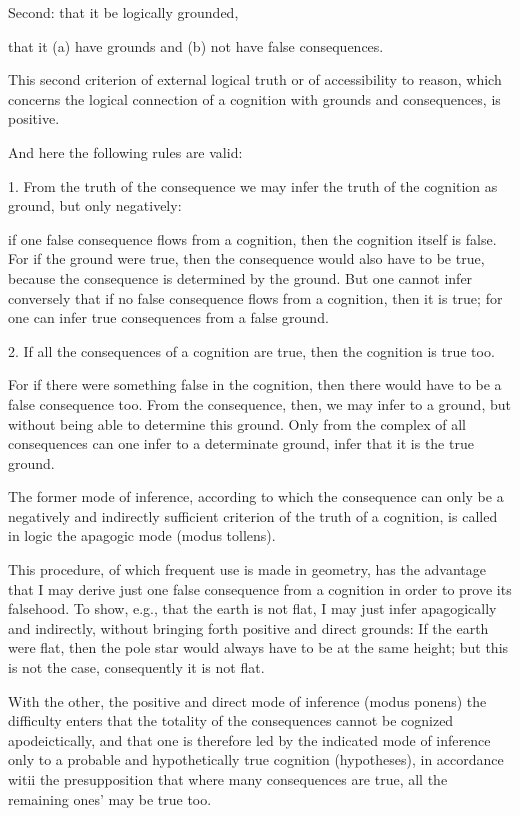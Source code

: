     Second: that it be logically grounded,

    that it (a) have grounds and (b) not have false consequences.

        This second criterion of external logical truth or
        of accessibility to reason, which concerns the logical connection of
        a cognition with grounds and consequences, is positive.

    And here the following rules are valid:

    1. From the truth of the consequence we may infer
    the truth of the cognition as ground, but only negatively:

        if one false consequence flows from a cognition,
        then the cognition itself is false.
        For if the ground were true,
        then the consequence would also have to be true,
        because the consequence is determined by the ground.
        But one cannot infer conversely that
        if no false consequence flows from a cognition, then it is true;
        for one can infer true consequences from a false ground.

    2. If all the consequences of a cognition are true,
    then the cognition is true too.

        For if there were something false in the cognition,
        then there would have to be a false consequence too.
        From the consequence, then, we may infer to a ground,
        but without being able to determine this ground.
        Only from the complex of all consequences can one
        infer to a determinate ground,
        infer that it is the true ground.

    The former mode of inference, according to which the consequence
    can only be a negatively and indirectly sufficient criterion of the truth of a
    cognition, is called in logic the apagogic mode (modus tollens).

        This procedure, of which frequent use is made in geometry,
        has the advantage that I may derive just one false consequence
        from a cognition in order to prove its falsehood.
        To show, e.g., that the earth is not flat, I may
        just infer apagogically and indirectly,
        without bringing forth positive and direct grounds:
        If the earth were flat, then the pole star would
        always have to be at the same height;
        but this is not the case, consequently it is not flat.

    With the other, the positive and direct mode of inference (modus ponens)
    the difficulty enters that the totality of the consequences cannot be
    cognized apodeictically, and that one is therefore led by the indicated
    mode of inference only to a probable and hypothetically true cognition
    (hypotheses), in accordance witii the presupposition that where many
    consequences are true, all the remaining ones' may be true too.

